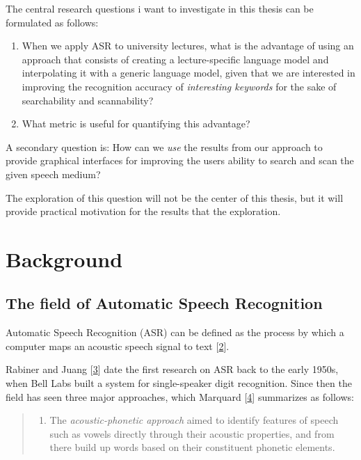 \documentclass[]{article}
\providecommand{\tightlist}{%
  \setlength{\itemsep}{0pt}\setlength{\parskip}{0pt}}
\begin{document}
The central research questions i want to investigate in this thesis can
be formulated as follows:

\begin{enumerate}
\def\labelenumi{(\arabic{enumi})}
\item
  When we apply ASR to university lectures, what is the advantage of
  using an approach that consists of creating a lecture-specific
  language model and interpolating it with a generic language model,
  given that we are interested in improving the recognition accuracy of
  \emph{interesting keywords} for the sake of searchability and
  scannability?
\item
  What metric is useful for quantifying this advantage?
\end{enumerate}

A secondary question is: How can we \emph{use} the results from our
approach to provide graphical interfaces for improving the users ability
to search and scan the given speech medium?

The exploration of this question will not be the center of this thesis,
but it will provide practical motivation for the results that the
exploration.

\section{Background}\label{background}

\subsection{The field of Automatic Speech
Recognition}\label{the-field-of-automatic-speech-recognition}

Automatic Speech Recognition (ASR) can be defined as the process by
which a computer maps an acoustic speech signal to text
{[}\hyperref[ref-cmufaq]{2}{]}.

Rabiner and Juang {[}\hyperref[ref-rabiner]{3}{]} date the first
research on ASR back to the early 1950s, when Bell Labs built a system
for single-speaker digit recognition. Since then the field has seen
three major approaches, which Marquard {[}\hyperref[ref-marquard]{4}{]}
summarizes as follows:

\begin{quote}
\begin{enumerate}
\def\labelenumi{\arabic{enumi}.}
\tightlist
\item
  The \emph{acoustic-phonetic approach} aimed to identify features of
  speech such as vowels directly through their acoustic properties, and
  from there build up words based on their constituent phonetic
  elements.
\end{enumerate}
\end{quote}
\end{document}
